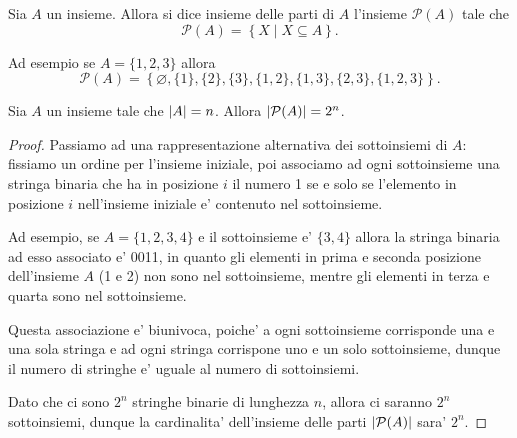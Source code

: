 \begin{definition}
    Sia $A$ un insieme. Allora si dice insieme delle parti di $A$ l'insieme $\mathcal{P}(A)$ tale che \[
        \mathcal{P}(A) = \left\{ X \mid X \subseteq A\right\}    
    .\]
\end{definition}

Ad esempio se $A = \{1, 2, 3\}$ allora \[
    \mathcal{P}(A) = \left\{ \varnothing, \{1\}, \{2\}, \{3\}, \{1, 2\}, \{1, 3\}, \{2, 3\}, \{1, 2, 3\} \right\}.
\]

\begin{proposition}
    Sia $A$ un insieme tale che $\left|A\right| = n$. Allora $\left|\mathcal{P}(A)\right| = 2^n$.
\end{proposition}
\begin{proof}
    Passiamo ad una rappresentazione alternativa dei sottoinsiemi di $A$: fissiamo un ordine per l'insieme iniziale, poi associamo ad ogni sottoinsieme una stringa binaria che ha in posizione $i$ il numero 1 se e solo se l'elemento in posizione $i$ nell'insieme iniziale e' contenuto nel sottoinsieme.

    Ad esempio, se $A = \{1, 2, 3, 4\}$ e il sottoinsieme e' $\{3, 4\}$ allora la stringa binaria ad esso associato e' 0011, in quanto gli elementi in prima e seconda posizione dell'insieme $A$ (1 e 2) non sono nel sottoinsieme, mentre gli elementi in terza e quarta sono nel sottoinsieme. 

    Questa associazione e' biunivoca, poiche' a ogni sottoinsieme corrisponde una e una sola stringa e ad ogni stringa corrispone uno e un solo sottoinsieme, dunque il numero di stringhe e' uguale al numero di sottoinsiemi.

    Dato che ci sono $2^n$ stringhe binarie di lunghezza $n$, allora ci saranno $2^n$ sottoinsiemi, dunque la cardinalita' dell'insieme delle parti $\left|\mathcal{P}(A)\right|$ sara' $2^n$.
\end{proof}

